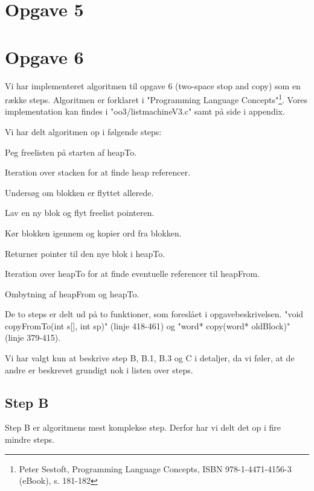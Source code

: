 \section{Opgave 5}
\label{O5}

\section{Opgave 6}
\label{O6}
Vi har implementeret algoritmen til opgave 6 (two-space stop and copy) som en række steps. Algoritmen er forklaret i "Programming Language Concepts"\footnote{Peter Sestoft, Programming Language Concepts, ISBN 978-1-4471-4156-3 (eBook), s. 181-182}. Vores implementation kan findes i "oo3/listmachineV3.c" samt på side \pageref{Code_V3} i appendix.

Vi har delt algoritmen op i følgende steps:
\begin{my_description}
\item[Step A] Peg freelisten på starten af heapTo.
\item[Step B] Iteration over stacken for at finde heap referencer.
	\begin{my_description}
	\item[Step B.1] Undersøg om blokken er flyttet allerede.
	\item[Step B.2] Lav en ny blok og flyt freelist pointeren.
	\item[Step B.3] Kør blokken igennem og kopier ord fra blokken.
	\item[Step B.4] Returner pointer til den nye blok i heapTo.
	\end{my_description}
\item[Step C] Iteration over heapTo for at finde eventuelle referencer til heapFrom.
\item[Step D] Ombytning af heapFrom og heapTo.
\end{my_description}

De to steps er delt ud på to funktioner, som foreslået i opgavebeskrivelsen. "void copyFromTo(int s[], int sp)" (linje 418-461) og "word* copy(word* oldBlock)" (linje 379-415).

Vi har valgt kun at beskrive step B, B.1, B.3 og C i detaljer, da vi føler, at de andre er beskrevet grundigt nok i listen over steps.
\subsection{Step B}
Step B er algoritmens mest komplekse step. Derfor har vi delt det op i fire mindre steps.

